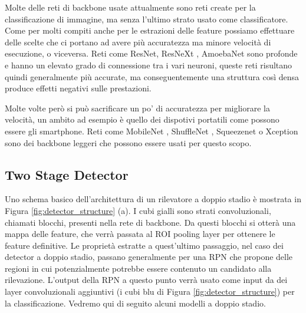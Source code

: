 Molte delle reti di backbone usate attualmente sono reti create per la classificazione di immagine, ma senza l'ultimo strato usato come classificatore. Come per molti compiti anche per le estrazioni delle feature possiamo effettuare delle scelte che ci portano ad avere più accuratezza ma minore velocità di esecuzione, o viceversa. 
Reti come ResNet\cite{viola2004robust}, ResNeXt \cite{he2015spatial}, AmoebaNet \cite{girshick2015fast} sono profonde e hanno un elevato grado di connessione tra i vari neuroni, queste reti risultano quindi generalmente più accurate, ma conseguentemente una struttura così densa produce effetti negativi sulle prestazioni. 

Molte volte però si può sacrificare un po' di accuratezza per migliorare la velocità, un ambito ad esempio è quello dei dispotivi portatili come possono essere gli smartphone. Reti come MobileNet \cite{ren2015faster}, ShuffleNet \cite{redmon2016you}, Squeezenet \cite{liu2016ssd} o Xception \cite{lin2017feature} sono dei backbone leggeri che possono essere usati per questo scopo. 

\subsection{Two Stage Detector}
\label{subsec:two_stage_detector}
Uno schema basico dell'architettura di un rilevatore a doppio stadio è mostrata in Figura \ref{fig:detector_structure} (a). I cubi gialli sono strati convoluzionali, chiamati blocchi, presenti nella rete di backbone. Da questi blocchi si otterà una mappa delle feature, che verrà passata al \ac{ROI} pooling layer per ottenere le feature definitive. 
Le proprietà estratte a quest'ultimo passaggio, nel caso dei detector a doppio stadio, passano generalmente per una \ac{RPN} che propone delle regioni in cui potenzialmente potrebbe essere contenuto un candidato alla rilevazione. L'output della \ac{RPN} a questo punto verrà usato come input da dei layer convoluzionali aggiuntivi (i cubi blu di Figura \ref{fig:detector_structure}) per la classificazione.
Vedremo qui di seguito alcuni modelli a doppio stadio. 

